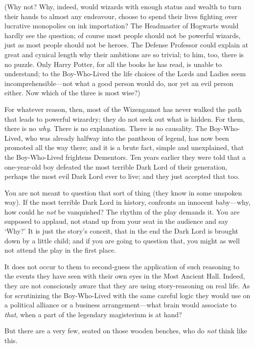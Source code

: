 (Why not? Why, indeed, would wizards with enough status and wealth to turn their hands to almost any endeavour, choose to spend their lives fighting over lucrative monopolies on ink importation? The Headmaster of Hogwarts would hardly see the question; of course most people should not be powerful wizards, just as most people should not be heroes. The Defense Professor could explain at great and cynical length why their ambitions are so trivial; to him, too, there is no puzzle. Only Harry Potter, for all the books he has read, is unable to understand; to the Boy-Who-Lived the life choices of the Lords and Ladies seem incomprehensible—not what a good person would do, nor yet an evil person either. Now which of the three is most wise?)

For whatever reason, then, most of the Wizengamot has never walked the path that leads to powerful wizardry; they do not seek out what is hidden. For them, there is no \emph{why}. There is no explanation. There is no causality. The Boy-Who-Lived, who was already halfway into the pantheon of legend, has now been promoted all the way there; and it is a brute fact, simple and unexplained, that the Boy-Who-Lived frightens Dementors. Ten years earlier they were told that a one-year-old boy defeated the most terrible Dark Lord of their generation, perhaps the most evil Dark Lord ever to live; and they just accepted that too.

You are not meant to question that sort of thing (they know in some unspoken way). If the most terrible Dark Lord in history, confronts an innocent baby—why, how could he \emph{not} be vanquished? The rhythm of the play demands it. You are supposed to applaud, not stand up from your seat in the audience and say `Why?' It is just the story's conceit, that in the end the Dark Lord is brought down by a little child; and if you are going to question that, you might as well not attend the play in the first place.

It does not occur to them to second-guess the application of such reasoning to the events they have seen with their own eyes in the Most Ancient Hall. Indeed, they are not consciously aware that they are using story-reasoning on real life. As for scrutinizing the Boy-Who-Lived with the same careful logic they would use on a political alliance or a business arrangement—what brain would associate to \emph{that}, when a part of the legendary magisterium is at hand?

But there are a very few, seated on those wooden benches, who do \emph{not} think like this.

